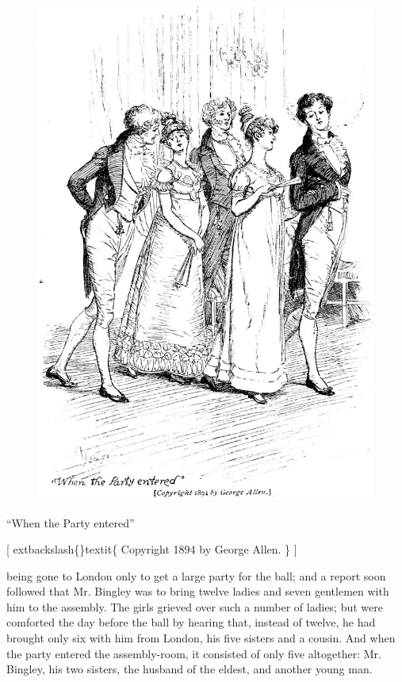 \documentclass[10pt]{book}
\begin{document}
\begin{figure}[h]
\centering
\includegraphics[width=\linewidth]{images/i_041.jpg}
\end{figure}

      “When the Party entered”
     

     [
     	extbackslash\{\}textit\{
      Copyright 1894 by George Allen.
     \}
     ]
    

   being gone to London only to get a large party for the ball; and a
report soon followed that Mr. Bingley was to bring twelve ladies and
seven gentlemen with him to the assembly. The girls grieved over such a
number of
   ladies; but were comforted the day before the ball by hearing
that, instead of twelve, he had brought only six with him from London,
his five sisters and a cousin. And when the party entered the
assembly-room, it consisted of only five altogether: Mr. Bingley, his
two sisters, the husband of the eldest, and another young man.
  
\end{document}
